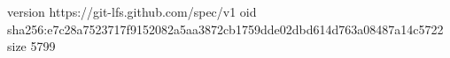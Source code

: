 version https://git-lfs.github.com/spec/v1
oid sha256:e7c28a7523717f9152082a5aa3872cb1759dde02dbd614d763a08487a14c5722
size 5799
